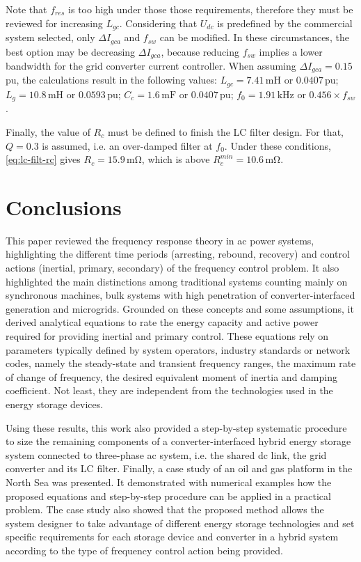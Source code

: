 \documentclass[utf8]{frontiersSCNS} %
\begin{document}
Note that $f_{res}$ is too high under those those requirements, therefore they must be reviewed for increasing $L_{gc}$. Considering that $U_{dc}$ is predefined by the commercial system selected, only $ \Delta I_{gca} $ and $f_{sw}$ can be modified. In these circumstances, the best option may be decreasing $ \Delta I_{gca} $, because reducing $f_{sw}$ implies a lower bandwidth for the grid converter current controller. When assuming $ \Delta I_{gca}=0.15$\,pu, the calculations result in the following values: $L_{gc}=7.41\,\si{\milli\henry}$ or $0.0407$\,pu; $L_{g}=10.8\,\si{\milli\henry}$ or $0.0593$\,pu; $C_c=1.6\,\si{\milli\farad}$ or $0.0407$\,pu; $f_{0}=1.91\,\si{\kilo\hertz}$ or $0.456 \times f_{sw}$.

Finally, the value of $R_c$ must be defined to finish the LC filter design. For that, $Q = 0.3$ is assumed, i.e. an over-damped filter at $f_{0}$. Under these conditions, \cref{eq:lc-filt-rc} gives $R_c = 15.9\,\si{\milli\ohm}$, which is above $R_c^{min}=10.6\,\si{\milli\ohm}$.

\section{Conclusions} \label{sec:conclusion}

This paper reviewed the frequency response theory in ac power systems, highlighting the different time periods (arresting, rebound, recovery) and control actions (inertial, primary, secondary) of the frequency control problem. It also highlighted the main distinctions among traditional systems counting mainly on synchronous machines, bulk systems with high penetration of converter-interfaced generation and microgrids. Grounded on these concepts and some assumptions, it derived analytical equations to rate the energy capacity and active power required for providing inertial and primary control. These equations rely on parameters typically defined by system operators, industry standards or network codes, namely the steady-state and transient frequency ranges, the maximum rate of change of frequency, the desired equivalent moment of inertia and damping coefficient. Not least, they are independent from the technologies used in the energy storage devices.

Using these results, this work also provided a step-by-step systematic procedure to size the remaining components of a converter-interfaced hybrid energy storage system connected to three-phase ac system, i.e. the shared dc link, the grid converter and its LC filter. Finally, a case study of an oil and gas platform in the North Sea was presented. It demonstrated with numerical examples how the proposed equations and step-by-step procedure can be applied in a practical problem. The case study also showed that the proposed method allows the system designer to take advantage of different energy storage technologies and set specific requirements for each storage device and converter in a hybrid system according to the type of frequency control action being provided. 
\end{document}
